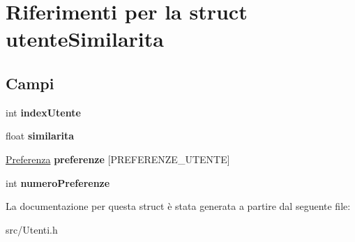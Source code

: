\hypertarget{structutente_similarita}{}\section{Riferimenti per la struct utente\+Similarita}
\label{structutente_similarita}
\subsection*{Campi}
\begin{DoxyCompactItemize}
\item 
\mbox{\label{structutente_similarita_a469f59ce3cb1b82e576dcffe98cf49ff}} 
int {\bfseries index\+Utente}
\item 
\mbox{\label{structutente_similarita_afb139e8f7a2b4b02f5ae38eabb03eae6}} 
float {\bfseries similarita}
\item 
\mbox{\label{structutente_similarita_a912a465c1d22224c522d7416604dbced}} 
\hyperlink{struct_preferenza}{Preferenza} {\bfseries preferenze} \mbox{[}P\+R\+E\+F\+E\+R\+E\+N\+Z\+E\+\_\+\+U\+T\+E\+N\+TE\mbox{]}
\item 
\mbox{\label{structutente_similarita_a087397c6e50f81807c992e1eaff8b275}} 
int {\bfseries numero\+Preferenze}
\end{DoxyCompactItemize}


La documentazione per questa struct è stata generata a partire dal seguente file\+:\begin{DoxyCompactItemize}
\item 
src/Utenti.\+h\end{DoxyCompactItemize}
